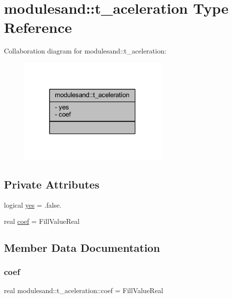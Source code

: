 \hypertarget{structmodulesand_1_1t__aceleration}{}\section{modulesand\+:\+:t\+\_\+aceleration Type Reference}
\label{structmodulesand_1_1t__aceleration}


Collaboration diagram for modulesand\+:\+:t\+\_\+aceleration\+:\nopagebreak
\begin{figure}[H]
\begin{center}
\leavevmode
\includegraphics[width=211pt]{structmodulesand_1_1t__aceleration__coll__graph}
\end{center}
\end{figure}
\subsection*{Private Attributes}
\begin{DoxyCompactItemize}
\item 
logical \mbox{\hyperlink{structmodulesand_1_1t__aceleration_a618a3cb27f7378fb9959fb3d2295ee1e}{yes}} = .false.
\item 
real \mbox{\hyperlink{structmodulesand_1_1t__aceleration_ae83a26f3519aeb66a05f7b285b7ebfc4}{coef}} = Fill\+Value\+Real
\end{DoxyCompactItemize}


\subsection{Member Data Documentation}
\mbox{\label{structmodulesand_1_1t__aceleration_ae83a26f3519aeb66a05f7b285b7ebfc4}} 
\subsubsection{\texorpdfstring{coef}{coef}}
{\footnotesize\ttfamily real modulesand\+::t\+\_\+aceleration\+::coef = Fill\+Value\+Real\hspace{0.3cm}{\ttfamily [private]}}

